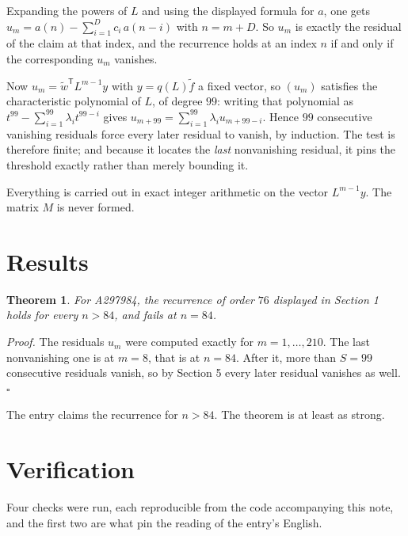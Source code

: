 \documentclass[11pt]{article}
\newtheorem{theorem}{Theorem}
\theoremstyle{definition}
\begin{document}
Expanding the powers of $L$ and using the displayed formula for $a$, one gets $u_m = a(n) - \sum_{i=1}^{D} c_i\,a(n-i)$ with $n = m + D$. So $u_m$ is exactly the residual of the claim at that index, and the recurrence holds at an index $n$ if and only if the corresponding $u_m$ vanishes.

Now $u_m = \tilde w^{\mathsf T} L^{m-1} y$ with $y = q(L)\tilde f$ a fixed vector, so $(u_m)$ satisfies the characteristic polynomial of $L$, of degree $99$: writing that polynomial as $t^{99} - \sum_{i=1}^{99} \lambda_i t^{99-i}$ gives $u_{m+99} = \sum_{i=1}^{99} \lambda_i u_{m+99-i}$. Hence $99$ consecutive vanishing residuals force every later residual to vanish, by induction. The test is therefore finite; and because it locates the {\itshape last} nonvanishing residual, it pins the threshold exactly rather than merely bounding it.

Everything is carried out in exact integer arithmetic on the vector $L^{m-1}y$. The matrix $M$ is never formed.

\section{Results}

\begin{theorem} For A297984, the recurrence of order $76$ displayed in Section 1 holds for every $n > 84$, and fails at $n = 84$.\end{theorem}

{\itshape Proof.} The residuals $u_m$ were computed exactly for $m = 1,\dots,210$. The last nonvanishing one is at $m = 8$, that is at $n = 84$. After it, more than $S = 99$ consecutive residuals vanish, so by Section 5 every later residual vanishes as well. $\square$

The entry claims the recurrence for $n > 84$. The theorem is at least as strong.

\section{Verification}

Four checks were run, each reproducible from the code accompanying this note, and the first two are what pin the reading of the entry's English.
\end{document}
